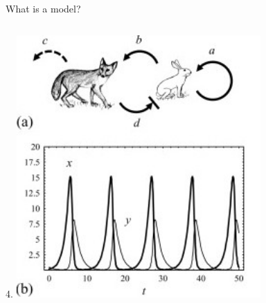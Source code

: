 \documentclass[mathserif,11pt]{beamer}
\begin{document}
\begin{frame}{What is a model?}
\begin{columns}
\begin{column}{0.5\textwidth}
	\vspace{0.2cm}
		4. \includegraphics[width=0.7\textwidth]{Figures/lotka_voltera.jpg}\\
\end{column}
\end{columns}
\end{frame}
\end{document}

